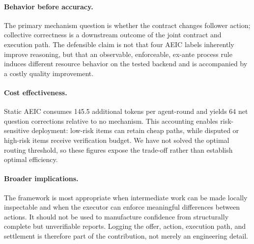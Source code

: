\paragraph{Behavior before accuracy.}
The primary mechanism question is whether the contract changes follower action; collective correctness is a downstream outcome of the joint contract and execution path. The defensible claim is not that four AEIC labels inherently improve reasoning, but that an observable, enforceable, ex-ante process rule induces different resource behavior on the tested backend and is accompanied by a costly quality improvement.

\paragraph{Cost effectiveness.}
Static AEIC consumes 145.5 additional tokens per agent-round and yields 64 net question corrections relative to no mechanism. This accounting enables risk-sensitive deployment: low-risk items can retain cheap paths, while disputed or high-risk items receive verification budget. We have not solved the optimal routing threshold, so these figures expose the trade-off rather than establish optimal efficiency.

\paragraph{Broader implications.}
The framework is most appropriate when intermediate work can be made locally inspectable and when the executor can enforce meaningful differences between actions. It should not be used to manufacture confidence from structurally complete but unverifiable reports. Logging the offer, action, execution path, and settlement is therefore part of the contribution, not merely an engineering detail.
